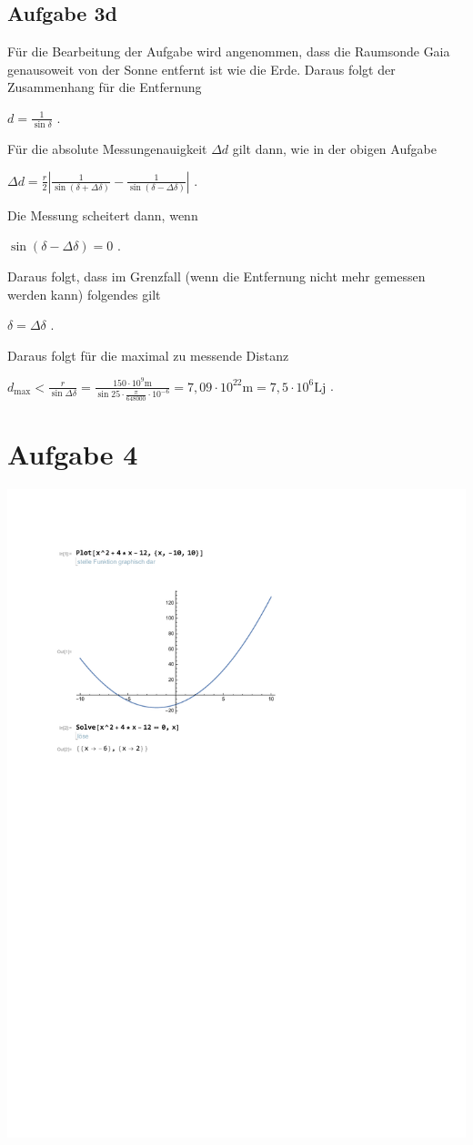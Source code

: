\documentclass[a4paper,11pt]{article}
\begin{document}
\subsection{Aufgabe 3d}
Für die Bearbeitung der Aufgabe wird angenommen, dass die Raumsonde Gaia genausoweit von der Sonne entfernt ist wie die Erde. 
Daraus folgt der Zusammenhang für die Entfernung
\begin{center}
  $d = \frac{1}{\sin \delta}$ .
\end{center}
Für die absolute Messungenauigkeit $\Delta d$ gilt dann, wie in der obigen Aufgabe
\begin{center}
  $
    \Delta d = \frac{r}{2} \left|  \frac{1}{\sin(\delta + \Delta\delta)} - \frac{1}{\sin(\delta - \Delta\delta)} \right|
  $ .
\end{center}
Die Messung scheitert dann, wenn
\begin{center}
  $ \sin(\delta - \Delta\delta) = 0$ .
\end{center}
Daraus folgt, dass im Grenzfall (wenn die Entfernung nicht mehr gemessen werden kann) folgendes gilt
\begin{center}
  $\delta = \Delta\delta$ .
\end{center}
Daraus folgt für die maximal zu messende Distanz 
\begin{center}
  $
    d_{\mbox{max}} < \frac{r}{\sin \Delta\delta} = \frac{150 \cdot 10^9 \mbox{m}}{\sin 25 \cdot \frac{\pi}{648000} \cdot 10^{-6}}
    = 7,09 \cdot 10^{22} \mbox{m} = 7,5 \cdot 10^{6} \mbox{Lj}
  $ .
\end{center}
\section{Aufgabe 4}

  \includegraphics{./aufgabe_4.pdf}
\end{document}
